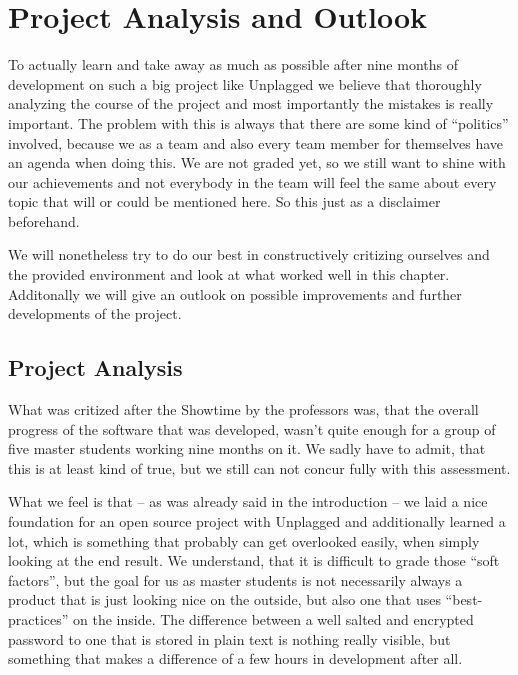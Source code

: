 \chapter{Project Analysis and Outlook}\label{chap:summaryAndOutlook}

To actually learn and take away as much as possible after nine months of development on such a big project like Unplagged we believe that thoroughly analyzing the course of the project and most importantly the mistakes is really important. The problem with this is always that there are some kind of \enquote{politics} involved, because we as a team and also every team member for themselves have an agenda when doing this. We are not graded yet, so we still want to shine with our achievements and not everybody in the team will feel the same about every topic that will or could be mentioned here. So this just as a disclaimer beforehand. 

We will nonetheless try to do our best in constructively critizing ourselves and the provided environment and look at what worked well in this chapter. Additonally we will give an outlook on possible improvements and further developments of the project.

\section{Project Analysis}

What was critized after the Showtime by the professors was, that the overall progress of the software that was developed, wasn't quite enough for a group of five master students working nine months on it. We sadly have to admit, that this is at least kind of true, but we still can not concur fully with this assessment.

What we feel is that -- as was already said in the introduction -- we laid a nice foundation for an open source project with Unplagged and additionally learned a lot, which is something that probably can get overlooked easily, when simply looking at the end result. We understand, that it is difficult to grade those \enquote{soft factors}, but the goal for us as master students is not necessarily always a product that is just looking nice on the outside, but also one that uses \enquote{best-practices} on the inside. 
The difference between a well salted and encrypted password to one that is stored in plain text is nothing really visible, but something that makes a difference of a few hours in development after all.

